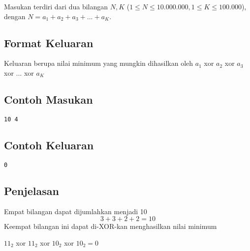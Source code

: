 \documentclass{article}
\begin{document}
Masukan terdiri dari dua bilangan  $N, K$ ($1 \leq N \leq 10.000.000, 1 \leq K \leq 100.000$), dengan $N = a_1 + a_2 + a_3 + ... + a_K$.

\subsection*{Format Keluaran}

Keluaran berupa nilai minimum yang mungkin dihasilkan oleh $a_1$ xor $a_2$ xor $a_3$ xor $...$ xor $a_K$
\\

\begin{multicols}{2}
\subsection*{Contoh Masukan}
\begin{lstlisting}
10 4
\end{lstlisting}
\columnbreak
\subsection*{Contoh Keluaran}
\begin{lstlisting}
0
\end{lstlisting}
\vfill
\null
\end{multicols}

\subsection*{Penjelasan}
Empat bilangan dapat dijumlahkan menjadi 10
\[ 3 + 3 + 2 + 2 = 10 \]
Keempat bilangan ini dapat di-XOR-kan menghasilkan nilai minimum
\begin{center}
$11_2$ xor $11_2$ xor $10_2$ xor $10_2 = 0$
\end{center}
\pagebreak
\end{document}
